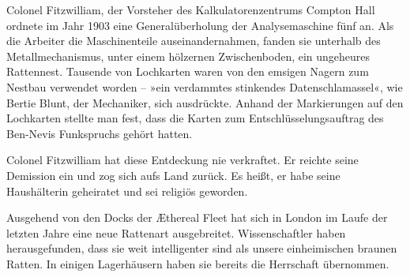 Colonel Fitzwilliam, der Vorsteher des Kalkulatorenzentrums Compton
Hall ordnete im Jahr 1903 eine Generalüberholung der
Analysemaschine fünf an. Als die Arbeiter die Maschinenteile
auseinandernahmen, fanden sie unterhalb des Metallmechanismus,
unter einem hölzernen Zwischenboden, ein ungeheures Rattennest.
Tausende von Lochkarten waren von den emsigen Nagern zum Nestbau
verwendet worden – »ein verdammtes stinkendes Datenschlamassel«,
wie Bertie Blunt, der Mechaniker, sich ausdrückte. Anhand der
Markierungen auf den Lochkarten stellte man fest, dass die Karten
zum Entschlüsselungsauftrag des Ben-Nevis Funkspruchs gehört
hatten.

\bigpar

Colonel Fitzwilliam hat diese Entdeckung nie verkraftet. Er reichte
seine Demission ein und zog sich aufs Land zurück. Es heißt, er
habe seine Haushälterin geheiratet und sei religiös geworden.

\bigpar

Ausgehend von den Docks der Æthereal Fleet hat sich in London im
Laufe der letzten Jahre eine neue Rattenart ausgebreitet.
Wissenschaftler haben herausgefunden, dass sie weit intelligenter
sind als unsere einheimischen braunen Ratten. In einigen
Lagerhäusern haben sie bereits die Herrschaft übernommen.



